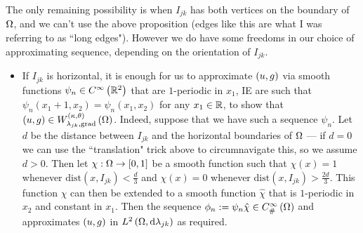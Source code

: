\documentclass[11pt]{report}
\newcommand{\psmooth}[1]{C^{\infty}_{\#}\bracs{#1}}
\begin{document}
The only remaining possibility is when $I_{jk}$ has both vertices on the boundary of $\Omega$, and we can't use the above proposition (edges like this are what I was referring to as ``long edges").
However we do have some freedoms in our choice of approximating sequence, depending on the orientation of $I_{jk}$.
\begin{itemize}
	\item If $I_{jk}$ is horizontal, it is enough for us to approximate $\left( u,g \right)$ via smooth functions $\psi_n\in C^{\infty}\left( \mathbb{R}^2 \right)$ that are $1$-periodic in $x_1$, IE are such that $\psi_n(x_1+1,x_2) = \psi_n(x_1,x_2)$ for any $x_1\in\mathbb{R}$, to show that $\left( u,g \right)\in W^{\left( \kappa, \theta \right)}_{\lambda_{jk}, \mathrm{grad}}\left( \Omega \right)$.
	Indeed, suppose that we have such a sequence $\psi_n$.
	Let $d$ be the distance between $I_{jk}$ and the horizontal boundaries of $\Omega$ --- if $d=0$ we can use the ``translation" trick above to circumnavigate this, so we assume $d>0$. 
	Then let $\chi:\Omega\rightarrow\left[ 0,1 \right]$ be a smooth function such that $\chi(x)=1$ whenever $\mathrm{dist}(x,I_{jk})<\frac{d}{3}$ and $\chi(x)=0$ whenever $\mathrm{dist}(x,I_{jk})>\frac{2d}{3}$.
	This function $\chi$ can then be extended to a smooth function $\hat{\chi}$ that is $1$-periodic in $x_2$ and constant in $x_1$.
	Then the sequence $\phi_n:=\psi_n\hat{\chi}\in\psmooth{\ddom}$ and approximates $\left( u,g \right)$ in $L^{2}\left( \Omega,\mathrm{d}\lambda_{jk} \right)$ as required.
	

\end{itemize}
\end{document}
